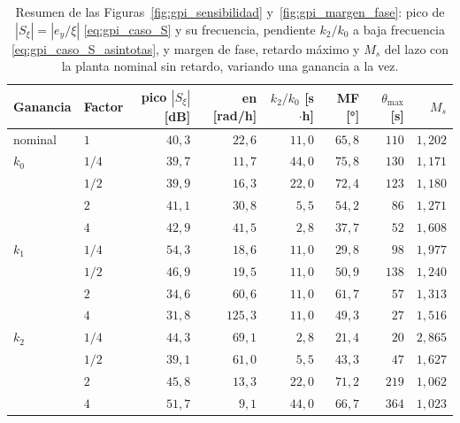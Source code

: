 \begin{table}[tbp]
\centering
\caption[Sensibilidad y robustez del GPI al variar sus ganancias]{Resumen de
  las Figuras~\ref{fig:gpi_sensibilidad} y~\ref{fig:gpi_margen_fase}: pico de
  $|S_{\xi}| = |e_y/\xi|$ \eqref{eq:gpi_caso_S} y su frecuencia, pendiente $k_2/k_0$
  a baja frecuencia \eqref{eq:gpi_caso_S_asintotas}, y margen de fase, retardo
  máximo y $M_s$ del lazo con la planta nominal sin retardo,
  variando una ganancia a la vez.}
\label{tab:gpi_frecuencia}
\small
\begin{tabular}{llrrrrrr}
\toprule
\textbf{Ganancia} & \textbf{Factor} & pico $|S_{\xi}|$ [dB] & en [rad/h] & $k_2/k_0$ [s$\cdot$h] & MF [°] & $\theta_{\max}$ [s] & $M_s$ \\
\midrule
nominal & $1$ & $40{,}3$ & $22{,}6$ & $11{,}0$ & $65{,}8$ & $110$ & $1{,}202$ \\
\midrule
$k_0$ & $1/4$ & $39{,}7$ & $11{,}7$ & $44{,}0$ & $75{,}8$ & $130$ & $1{,}171$ \\
 & $1/2$ & $39{,}9$ & $16{,}3$ & $22{,}0$ & $72{,}4$ & $123$ & $1{,}180$ \\
 & $2$ & $41{,}1$ & $30{,}8$ & $5{,}5$ & $54{,}2$ & $86$ & $1{,}271$ \\
 & $4$ & $42{,}9$ & $41{,}5$ & $2{,}8$ & $37{,}7$ & $52$ & $1{,}608$ \\
\midrule
$k_1$ & $1/4$ & $54{,}3$ & $18{,}6$ & $11{,}0$ & $29{,}8$ & $98$ & $1{,}977$ \\
 & $1/2$ & $46{,}9$ & $19{,}5$ & $11{,}0$ & $50{,}9$ & $138$ & $1{,}240$ \\
 & $2$ & $34{,}6$ & $60{,}6$ & $11{,}0$ & $61{,}7$ & $57$ & $1{,}313$ \\
 & $4$ & $31{,}8$ & $125{,}3$ & $11{,}0$ & $49{,}3$ & $27$ & $1{,}516$ \\
\midrule
$k_2$ & $1/4$ & $44{,}3$ & $69{,}1$ & $2{,}8$ & $21{,}4$ & $20$ & $2{,}865$ \\
 & $1/2$ & $39{,}1$ & $61{,}0$ & $5{,}5$ & $43{,}3$ & $47$ & $1{,}627$ \\
 & $2$ & $45{,}8$ & $13{,}3$ & $22{,}0$ & $71{,}2$ & $219$ & $1{,}062$ \\
 & $4$ & $51{,}7$ & $9{,}1$ & $44{,}0$ & $66{,}7$ & $364$ & $1{,}023$ \\
\bottomrule
\end{tabular}
\end{table}


